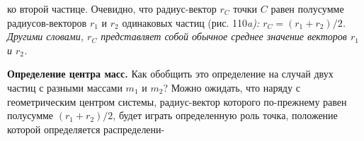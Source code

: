 \documentclass[11pt, a4paper]{article}
\begin{document}
\begin{adjustwidth}{1.5cm}{}
		
		
		 ко второй частице. Очевидно, что радиус-вектор $r_C$ точки $C$ равен полусумме радиусов-векторов $r_1$ и $r_2$ одинаковых частиц (рис. 110\it a\rm): $r_C = (r_1 + r_2)/2$. Другими словами, $r_C$ представляет собой обычное среднее значение векторов $r_1$ и $r_2$.
		
		\vspace{0.4cm}
		
		\noindent\textbf{Определение центра масс.} Как обобщить это определение на случай двух частиц с разными массами $m_1$ и $m_2$? Можно ожидать, что наряду с геометрическим центром системы, радиус-вектор которого по-прежнему равен полусумме $(r _1+ r _2)/2$, будет играть определенную роль точка, положение которой определяется распределени-
		
		
	\end{adjustwidth}
	
\end{document}
